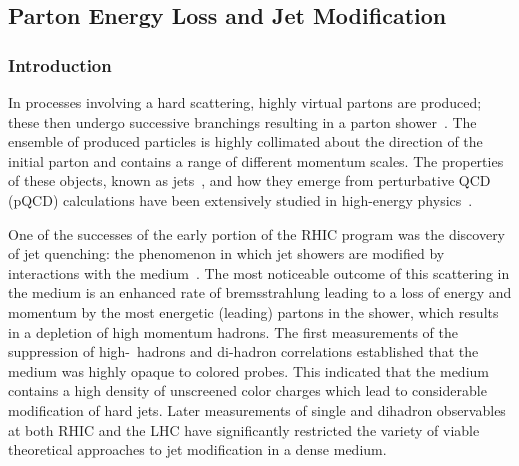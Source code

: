 \subsection{Parton Energy Loss and Jet Modification}
\label{Sec:Jets}

\subsubsection{Introduction}
\label{Sec:JetIntro}

In processes involving a hard scattering, highly virtual partons
are produced; these then undergo successive branchings resulting in a parton
shower~\cite{Field:1976ve}. The  ensemble of produced particles is highly collimated about
the direction of the initial parton and contains a range of different
momentum scales. The properties of these objects, known as jets~\cite{Sterman:1977wj}, and
how they emerge from perturbative QCD (pQCD) calculations have been extensively studied in high-energy
physics~\cite{Feynman:1978dt,Field:1977fa}. 




One of the successes of the early portion of the RHIC program
was the discovery of jet quenching\cite{Adcox:2001jp,Adler:2002xw}: the phenomenon in which jet showers are modified by interactions with the
medium~\cite{Bjorken:1982tu}. The most noticeable outcome of this scattering in the medium is an enhanced rate of bremsstrahlung leading to a 
loss of energy and momentum by the most energetic (leading) partons in the shower, which results in a depletion of high momentum hadrons. 
The first measurements of the suppression of high-\pT\ hadrons
and di-hadron correlations established that the medium was highly
opaque to colored probes. This indicated that the medium contains a
high density of unscreened color charges which lead to considerable modification of hard jets. 
Later measurements of single and dihadron observables at both RHIC and the LHC have significantly restricted
the variety of viable theoretical approaches to jet modification in a dense medium. 


